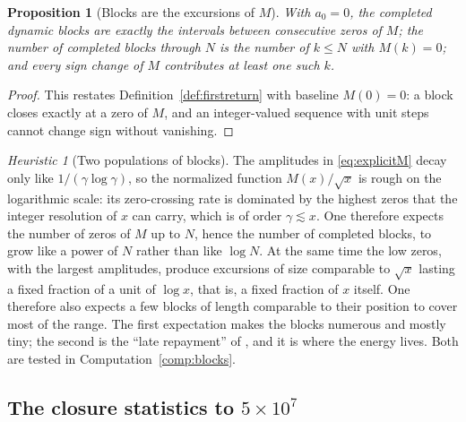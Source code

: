 \documentclass[11pt]{article}
\newtheorem{proposition}[theorem]{Proposition}
\theoremstyle{definition}
\theoremstyle{remark}
\newtheorem{heuristic}[theorem]{Heuristic}
\begin{document}
\begin{proposition}[Blocks are the excursions of $M$]\label{prop:cluster}
With $a_0=0$, the completed dynamic blocks are exactly the intervals between consecutive zeros of $M$; the number of completed blocks through $N$ is the number of $k\le N$ with $M(k)=0$; and every sign change of $M$ contributes at least one such $k$.
\end{proposition}

\begin{proof}
This restates Definition~\ref{def:firstreturn} with baseline $M(0)=0$: a block closes exactly at a zero of $M$, and an integer-valued sequence with unit steps cannot change sign without vanishing.
\end{proof}

\begin{heuristic}[Two populations of blocks]\label{heur:scale}
The amplitudes in \eqref{eq:explicitM} decay only like $1/(\gamma\log\gamma)$, so the normalized function $M(x)/\sqrt x$ is rough on the logarithmic scale: its zero-crossing rate is dominated by the highest zeros that the integer resolution of $x$ can carry, which is of order $\gamma\lesssim x$. One therefore expects the number of zeros of $M$ up to $N$, hence the number of completed blocks, to grow like a power of $N$ rather than like $\log N$. At the same time the low zeros, with the largest amplitudes, produce excursions of size comparable to $\sqrt x$ lasting a fixed fraction of a unit of $\log x$, that is, a fixed fraction of $x$ itself. One therefore also expects a few blocks of length comparable to their position to cover most of the range. The first expectation makes the blocks numerous and mostly tiny; the second is the ``late repayment'' of \cite{michaels-colors}, and it is where the energy lives. Both are tested in Computation~\ref{comp:blocks}.
\end{heuristic}

\subsection{The closure statistics to \texorpdfstring{$5\times10^7$}{5e7}}
\end{document}
